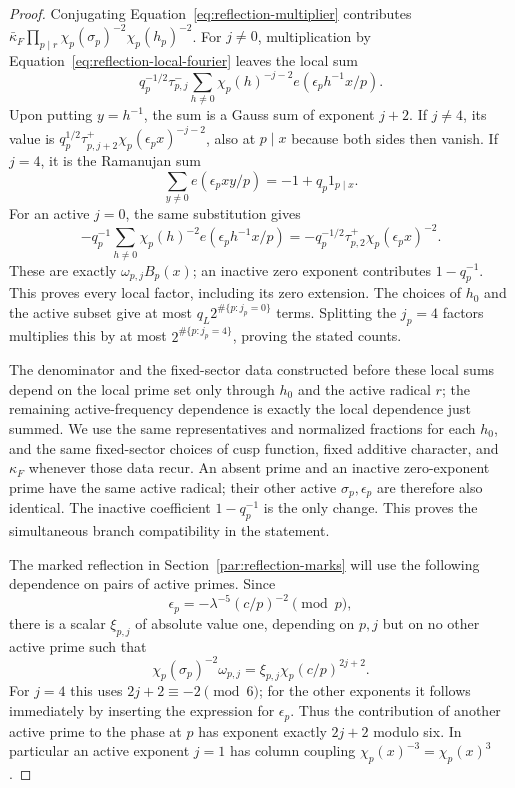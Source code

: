 \documentclass[11pt,a4paper]{article}
\numberwithin{equation}{section}
\numberwithin{figure}{section}
\theoremstyle{definition}
\theoremstyle{remark}
\begin{document}
\begin{proof}
Conjugating Equation~\eqref{eq:reflection-multiplier} contributes
$\bar\kappa_F\prod_{p\mid r}\chi_p(\sigma_p)^{-2}\chi_p(h_p)^{-2}$.
For $j\ne0$, multiplication by
Equation~\eqref{eq:reflection-local-fourier} leaves the local sum
\[
 q_p^{-1/2}\tau_{p,j}^{-}
 \sum_{h\ne0}\chi_p(h)^{-j-2}e(\epsilon_ph^{-1}x/p).
\]
Upon putting $y=h^{-1}$, the sum is a Gauss sum of exponent $j+2$.
If $j\ne4$, its value is
$q_p^{1/2}\tau_{p,j+2}^{+}\chi_p(\epsilon_px)^{-j-2}$, also at
$p\mid x$ because both sides then vanish.  If $j=4$, it is the
Ramanujan sum
\[
 \sum_{y\ne0}e(\epsilon_pxy/p)=-1+q_p1_{p\mid x}.
\]
For an active $j=0$, the same substitution gives
\[
 -q_p^{-1}\sum_{h\ne0}\chi_p(h)^{-2}e(\epsilon_ph^{-1}x/p)
 =-q_p^{-1/2}\tau_{p,2}^{+}\chi_p(\epsilon_px)^{-2}.
\]
These are exactly $\omega_{p,j}B_p(x)$; an inactive zero exponent
contributes $1-q_p^{-1}$.  This proves every local factor, including
its zero extension.  The choices of $h_0$ and the active subset give at
most $q_L2^{\#\{p:j_p=0\}}$ terms.  Splitting the $j_p=4$ factors
multiplies this by at most $2^{\#\{p:j_p=4\}}$, proving the stated
counts.

The denominator and the fixed-sector data constructed before these local
sums depend on the local prime set only through $h_0$ and the active radical
$r$; the remaining active-frequency dependence is exactly the local dependence
just summed.  We use the same representatives
and normalized fractions for each $h_0$, and the same fixed-sector choices
of cusp function, fixed additive character, and $\kappa_F$ whenever those
data recur.  An absent prime and an inactive zero-exponent prime have the
same active radical; their other active $\sigma_p,\epsilon_p$ are therefore
also identical.  The inactive coefficient $1-q_p^{-1}$ is the only change.
This proves the simultaneous branch compatibility in the statement.

The marked reflection in Section~\ref{par:reflection-marks} will use the
following dependence on pairs of active primes.  Since
\[
 \epsilon_p=-\lambda^{-5}(c/p)^{-2}\pmod p,
\]
there is a scalar $\xi_{p,j}$ of absolute value one, depending on $p,j$ but on no other
active prime such that
\begin{equation}\label{eq:reflection-cross-prime-phase}
 \chi_p(\sigma_p)^{-2}\omega_{p,j}
       =\xi_{p,j}\chi_p(c/p)^{2j+2}.
\end{equation}
For $j=4$ this uses $2j+2\equiv-2\pmod6$; for the other exponents it
follows immediately by inserting the expression for $\epsilon_p$.
Thus the contribution of another active prime to the phase at $p$ has
exponent exactly $2j+2$ modulo six.  In particular an active exponent
$j=1$ has column coupling $\chi_p(x)^{-3}=\chi_p(x)^3$.


\end{proof}
\end{document}
